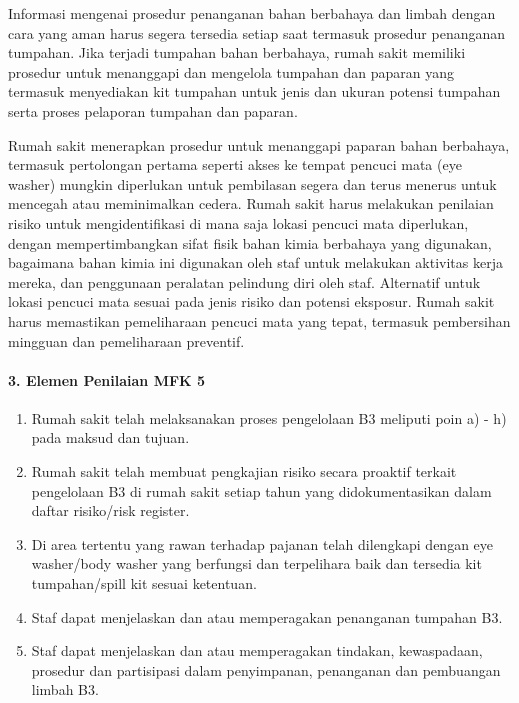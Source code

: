 \documentclass[
]{book}
\providecommand{\tightlist}{%
  \setlength{\itemsep}{0pt}\setlength{\parskip}{0pt}}
\begin{document}
Informasi mengenai prosedur penanganan bahan berbahaya dan limbah dengan cara yang aman harus segera tersedia setiap saat termasuk prosedur penanganan tumpahan. Jika terjadi tumpahan bahan berbahaya, rumah sakit memiliki prosedur untuk menanggapi dan mengelola tumpahan dan paparan yang termasuk menyediakan kit tumpahan untuk jenis dan ukuran potensi tumpahan serta proses pelaporan tumpahan dan paparan.

Rumah sakit menerapkan prosedur untuk menanggapi paparan bahan berbahaya, termasuk pertolongan pertama seperti akses ke tempat pencuci mata (eye washer) mungkin diperlukan untuk pembilasan segera dan terus menerus untuk mencegah atau meminimalkan cedera. Rumah sakit harus melakukan penilaian risiko untuk mengidentifikasi di mana saja lokasi pencuci mata diperlukan, dengan mempertimbangkan sifat fisik bahan kimia berbahaya yang digunakan, bagaimana bahan kimia ini digunakan oleh staf untuk melakukan aktivitas kerja mereka, dan penggunaan peralatan pelindung diri oleh staf. Alternatif untuk lokasi pencuci mata sesuai pada jenis risiko dan potensi eksposur. Rumah sakit harus memastikan pemeliharaan pencuci mata yang tepat, termasuk pembersihan mingguan dan pemeliharaan preventif.

\hypertarget{elemen-penilaian-mfk-5}{%
\paragraph*{3. Elemen Penilaian MFK 5}\label{elemen-penilaian-mfk-5}}

\begin{enumerate}
\def\labelenumi{\alph{enumi}.}
\tightlist
\item
  Rumah sakit telah melaksanakan proses pengelolaan B3 meliputi poin a) - h) pada maksud dan tujuan.
\item
  Rumah sakit telah membuat pengkajian risiko secara proaktif terkait pengelolaan B3 di rumah sakit setiap tahun yang didokumentasikan dalam daftar risiko/risk register.
\item
  Di area tertentu yang rawan terhadap pajanan telah dilengkapi dengan eye washer/body washer yang berfungsi dan terpelihara baik dan tersedia kit tumpahan/spill kit sesuai ketentuan.
\item
  Staf dapat menjelaskan dan atau memperagakan penanganan tumpahan B3.
\item
  Staf dapat menjelaskan dan atau memperagakan tindakan, kewaspadaan, prosedur dan partisipasi dalam penyimpanan, penanganan dan pembuangan limbah B3.
\end{enumerate}
\end{document}
